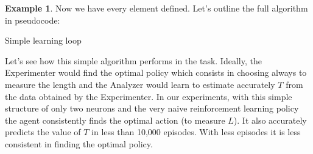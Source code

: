 \documentclass[11pt,a4paper,twoside]{report}
\DeclareMathOperator*{\argmax}{arg\,max}
\newcommand{\+}{\textnormal{+} }
\theoremstyle{definition}
\newtheorem{myex}[mythm]{Example}
\numberwithin{equation}{chapter}
\begin{document}
\begin{myex}
Now we have every element defined. Let's outline the full algorithm in 
pseudocode:

  \makeatletter
  \def\BState{\State\hskip-\ALG@thistlm}
  \makeatother
  \begin{algorithm}
    \caption{Simple learning loop}\label{pendulum}
    \end{algorithm}
\end{myex}

Let's see how this simple algorithm performs in the task. Ideally, the
Experimenter would find the optimal policy which consists in choosing always to
measure the length and the Analyzer would learn to estimate accurately $T$ from
the data obtained by the Experimenter. In our experiments, with this simple
structure of only two neurons and the very naive reinforcement learning policy
the agent consistently finds the optimal action (to measure $L$). It also
accurately predicts the value of $T$ in less than 10,000 episodes. With less
episodes it is less consistent in finding the optimal policy.
\end{document}
